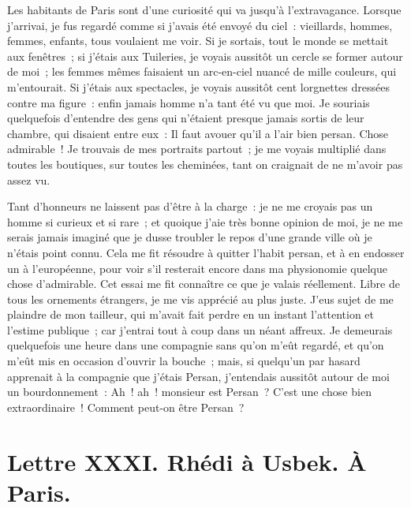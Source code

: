 \documentclass[french,twoside]{book} %
\newcommand{\dateline}[1]{\medskip{\RaggedLeft{#1}\par}\bigskip}
\begin{document}
\noindent Les habitants de Paris sont d’une curiosité qui va jusqu’à l’extravagance. Lorsque j’arrivai, je fus regardé comme si j’avais été envoyé du ciel : vieillards, hommes, femmes, enfants, tous voulaient me voir. Si je sortais, tout le monde se mettait aux fenêtres ; si j’étais aux Tuileries, je voyais aussitôt un cercle se former autour de moi ; les femmes mêmes faisaient un arc-en-ciel nuancé de mille couleurs, qui m’entourait. Si j’étais aux spectacles, je voyais aussitôt cent lorgnettes dressées contre ma figure : enfin jamais homme n’a tant été vu que moi. Je souriais quelquefois d’entendre des gens qui n’étaient presque jamais sortis de leur chambre, qui disaient entre eux : Il faut avouer qu’il a l’air bien persan. Chose admirable ! Je trouvais de mes portraits partout ; je me voyais multiplié dans toutes les boutiques, sur toutes les cheminées, tant on craignait de ne m’avoir pas assez vu.\par
Tant d’honneurs ne laissent pas d’être à la charge : je ne me croyais pas un homme si curieux et si rare ; et quoique j’aie très bonne opinion de moi, je ne me serais jamais imaginé que je dusse troubler le repos d’une grande ville où je n’étais point connu. Cela me fit résoudre à quitter l’habit persan, et à en endosser un à l’européenne, pour voir s’il resterait encore dans ma physionomie quelque chose d’admirable. Cet essai me fit connaître ce que je valais réellement. Libre de tous les ornements étrangers, je me vis apprécié au plus juste. J’eus sujet de me plaindre de mon tailleur, qui m’avait fait perdre en un instant l’attention et l’estime publique ; car j’entrai tout à coup dans un néant affreux. Je demeurais quelquefois une heure dans une compagnie sans qu’on m’eût regardé, et qu’on m’eût mis en occasion d’ouvrir la bouche ; mais, si quelqu’un par hasard apprenait à la compagnie que j’étais Persan, j’entendais aussitôt autour de moi un bourdonnement : Ah ! ah ! monsieur est Persan ? C’est une chose bien extraordinaire ! Comment peut-on être Persan ?\par

\dateline{À Paris, le 6 de la lune de Chalval, 1712}
\section[{Lettre XXXI. Rhédi à Usbek. À Paris.}]{Lettre XXXI. Rhédi à Usbek. À Paris.}\renewcommand{\leftmark}{Lettre XXXI. Rhédi à Usbek. À Paris.}
\end{document}
